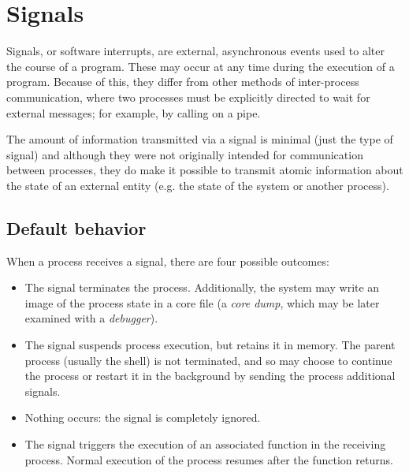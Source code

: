 %
%

\chapter{Signals}
\label{sec/signals}

Signals, or software interrupts, are external, asynchronous events
used to alter the course of a program.  These may occur at any
time during the execution of a program.  Because of this,
they differ from other methods of inter-process communication, where
two processes must be explicitly directed to wait for external messages;
for example, by calling  on a pipe.

The amount of information transmitted via a signal is minimal (just
the type of signal) and although they were not originally
intended for communication between processes, they do make it
possible to transmit atomic information about the state of an
external entity (e.g. the state of the system or another process). 

\section{Default behavior}

When a process receives a signal, there are four possible outcomes:
%
\begin{itemize}
\item 
The signal terminates the process.  Additionally, the system may write
an image of the process state in a core file (a \emph{core dump}, which
may be later examined with a \emph{debugger}).
%
\item 
The signal suspends process execution, but retains it in memory.  The
parent process (usually the shell) is not terminated, and so may
choose to continue the process or restart it in the background by
sending the process additional signals.
%
\item Nothing occurs: the signal is completely ignored.
%
\item The signal triggers the execution of an associated function in the
receiving process.  Normal execution of the process resumes after the
function returns.
\end{itemize}
%

